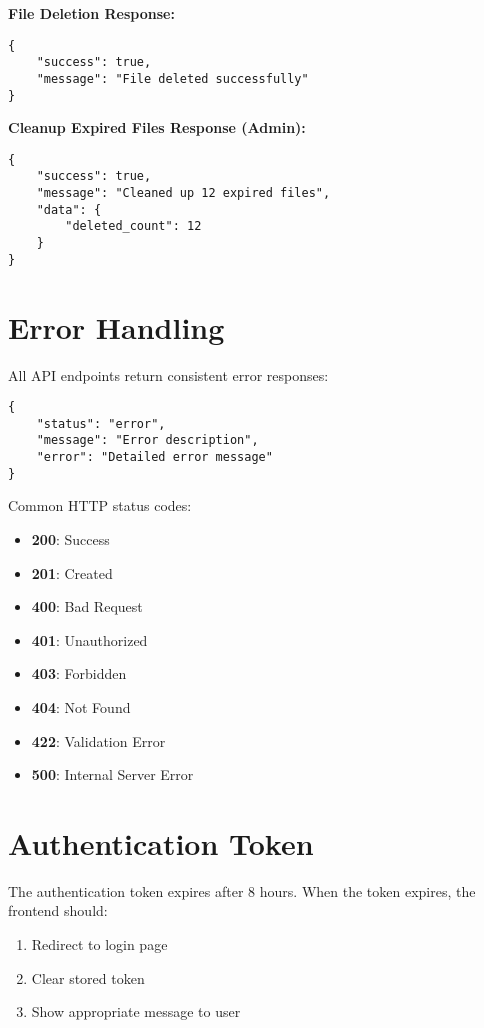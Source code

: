 \documentclass[12pt,a4paper]{article}
\begin{document}
\textbf{File Deletion Response:}
\begin{lstlisting}
{
    "success": true,
    "message": "File deleted successfully"
}
\end{lstlisting}

\textbf{Cleanup Expired Files Response (Admin):}
\begin{lstlisting}
{
    "success": true,
    "message": "Cleaned up 12 expired files",
    "data": {
        "deleted_count": 12
    }
}
\end{lstlisting}

\section{Error Handling}

All API endpoints return consistent error responses:

\begin{lstlisting}
{
    "status": "error",
    "message": "Error description",
    "error": "Detailed error message"
}
\end{lstlisting}

Common HTTP status codes:
\begin{itemize}
    \item \textbf{200}: Success
    \item \textbf{201}: Created
    \item \textbf{400}: Bad Request
    \item \textbf{401}: Unauthorized
    \item \textbf{403}: Forbidden
    \item \textbf{404}: Not Found
    \item \textbf{422}: Validation Error
    \item \textbf{500}: Internal Server Error
\end{itemize}

\section{Authentication Token}

The authentication token expires after 8 hours. When the token expires, the frontend should:
\begin{enumerate}
    \item Redirect to login page
    \item Clear stored token
    \item Show appropriate message to user
\end{enumerate}
\end{document}

